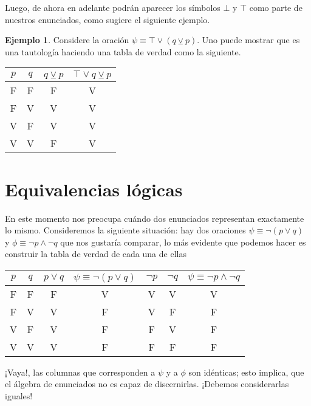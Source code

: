 \documentclass{book}
\theoremstyle{definition}
\newtheorem{ejm}{Ejemplo}[chapter]
\begin{document}
Luego, de ahora en adelante podrán aparecer los símbolos $\bot$ y $\top$ como parte de nuestros enunciados, como sugiere el siguiente ejemplo.

\begin{ejm}
	Considere la oración $\psi \equiv \top \vee (q \veebar p)$. Uno puede mostrar que es una tautología haciendo una tabla de verdad como la siguiente.
	\begin{center}\begin{tabular}{|c|c||c|c|}
		\hline
		$p$ & $q$ & $q\veebar p$ & $\top \vee q\veebar p$ \\
		\hline\hline
		F & F & F & V \\ \hline
		F & V & V & V \\ \hline
		V & F & V & V \\ \hline
		V & V & F & V \\ \hline
	\end{tabular}\end{center}
\end{ejm}

\section{Equivalencias lógicas}
En este momento nos preocupa cuándo dos enunciados representan exactamente lo mismo.
Consideremos la siguiente situación: hay dos oraciones $\psi \equiv \neg (p \vee q)$ y $\phi \equiv \neg p \wedge \neg q$ que nos gustaría comparar, lo más evidente que podemos hacer es construir la tabla de verdad de cada una de ellas
\begin{center}\begin{tabular}{|c|c||c|c|c|c|c|}
	\hline
	$p$ & $q$ & $p\vee q$ & $\psi \equiv \neg (p \vee q)$ & $\neg p$ & $\neg q$ & $\psi \equiv \neg p \wedge \neg q$ \\
	\hline\hline
	F & F & F & V & V & V & V \\ \hline
	F & V & V & F & V & F & F \\ \hline
	V & F & V & F & F & V & F \\ \hline
	V & V & V & F & F & F & F \\ \hline
\end{tabular}\end{center}
¡Vaya!, las columnas que corresponden a $\psi$ y a $\phi$ son idénticas; esto implica, que el álgebra de enunciados no es capaz de discernirlas. ¡Debemos considerarlas iguales!
\end{document}
